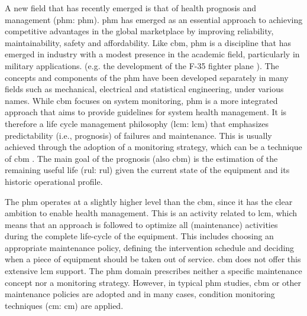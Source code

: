 A new field that has recently emerged is that of health prognosis and management (\acrlong{phm}: \acrshort{phm}). \acrshort{phm} has emerged as an essential approach to achieving competitive advantages in the global marketplace by improving reliability, maintainability, safety and affordability. Like \acrshort{cbm}, \acrshort{phm} is a discipline that has emerged in industry with a modest presence in the academic field, particularly in military applications\cite{Tinga2014}. (e.g. the development of the F-35 fighter plane \cite{Brown2007}).
The concepts and components of the \acrshort{phm} have been developed separately in many fields such as mechanical, electrical and statistical engineering, under various names\cite{Tsui2015}. While \acrshort{cbm} focuses on system monitoring, \acrshort{phm} is a more integrated approach that aims to provide guidelines for system health management. It is therefore a life cycle management philosophy (\acrlong{lcm}: \acrshort{lcm}) that emphasizes predictability (i.e., prognosis) of failures and maintenance. This is usually achieved through the adoption of a monitoring strategy, which can be a technique of \acrshort{cbm} \cite{Tinga2014}. The main goal of the prognosis (also \acrshort{cbm}) is the estimation of the remaining useful life (\acrlong{rul}: \acrshort{rul}) given the current state of the equipment and its historic operational profile\cite{Jardine2006}.

The \acrshort{phm} operates at a slightly higher level than the \acrshort{cbm}, since it has the clear ambition to enable health management. This is an activity related to \acrshort{lcm}, which means that an approach is followed to optimize all (maintenance) activities during the complete life-cycle of the equipment. This includes choosing an appropriate maintenance policy, defining the intervention schedule and deciding when a piece of equipment should be taken out of service. \acrshort{cbm} does not offer this extensive \acrshort{lcm} support. The \acrshort{phm} domain prescribes neither a specific maintenance concept nor a monitoring strategy. However, in typical \acrshort{phm} studies, \acrshort{cbm} or other maintenance policies are adopted and in many cases, condition monitoring techniques (\acrlong{cm}: \acrshort{cm}) are applied\cite{Tinga2014}.

